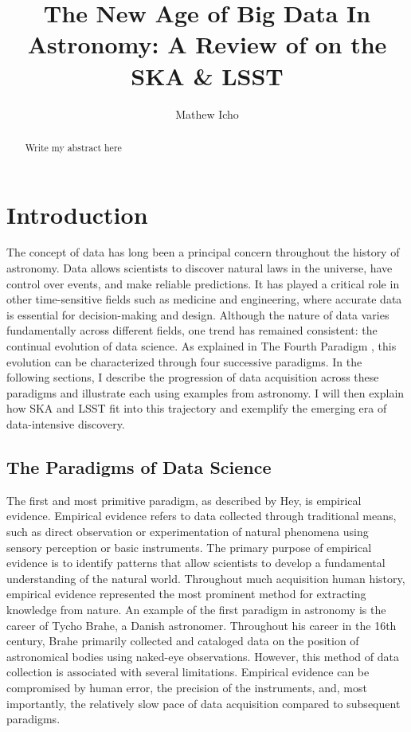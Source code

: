 \documentclass[preprint2,linenumbers, longauthor]{aastex631}
\begin{document}
\title{The New Age of Big Data In Astronomy: A Review of on the SKA \& LSST}
\author{Mathew Icho}

\begin{abstract}
Write my abstract here
\end{abstract}

\tableofcontents

\section{Introduction}
The concept of data has long been a principal concern throughout the history of astronomy. Data allows scientists to discover natural laws in the universe, have control over events, and make reliable predictions. It has played a critical role in other time-sensitive fields such as medicine and engineering, where accurate data is essential for decision-making and design. Although the nature of data varies fundamentally across different fields, one trend has remained consistent: the continual evolution of data science. As explained in The Fourth Paradigm \citep{heyFourthParadigmDataIntensive2009}, this evolution can be characterized through four successive paradigms. In the following sections, I describe the progression of data acquisition across these paradigms and illustrate each using examples from astronomy. I will then explain how SKA and LSST fit into this trajectory and exemplify the emerging era of data-intensive discovery.
\subsection{The Paradigms of Data Science}
The first and most primitive paradigm, as described by Hey, is empirical evidence. 
Empirical evidence refers to data collected through traditional means, such as direct observation or experimentation of natural phenomena using sensory perception or basic instruments. 
The primary purpose of empirical evidence is to identify patterns that allow scientists to develop a fundamental understanding of the natural world. 
Throughout much acquisition human history, empirical evidence represented the most prominent method for extracting knowledge from nature. 
An example of the first paradigm in astronomy is the career of Tycho Brahe, a Danish astronomer. Throughout his career in the 16th century, Brahe primarily collected and cataloged data on the position of astronomical bodies using naked-eye observations. 
However, this method of data collection is associated with several limitations. Empirical evidence can be compromised by human error, the precision of the instruments, and, most importantly, the relatively slow pace of data acquisition compared to subsequent paradigms.
\end{document}
